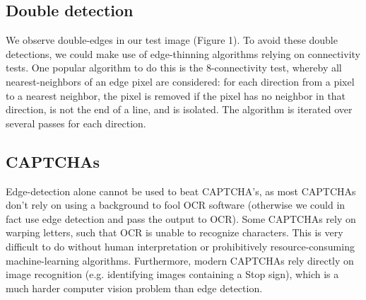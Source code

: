 \documentclass[11pt]{article}
\begin{document}
\subsection{Double detection}
We observe double-edges in our test image (Figure 1). To avoid these double detections, we could make use of edge-thinning algorithms relying on connectivity tests. One popular algorithm to do this is the 8-connectivity test, whereby all nearest-neighbors of an edge pixel are considered: for each direction from a pixel to a nearest neighbor, the pixel is removed if the pixel has no neighbor in that direction, is not the end of a line, and is isolated. The algorithm is iterated over several passes for each direction.

\subsection{CAPTCHAs}
Edge-detection alone cannot be used to beat CAPTCHA's, as most CAPTCHAs don't rely on using a background to fool OCR software (otherwise we could in fact use edge detection and pass the output to OCR). Some CAPTCHAs rely on warping letters, such that OCR is unable to recognize characters. This is very difficult to do without human interpretation or prohibitively resource-consuming machine-learning algorithms. Furthermore, modern CAPTCHAs rely directly on image recognition (e.g. identifying images containing a Stop sign), which is a much harder computer vision problem than edge detection.
\end{document}
